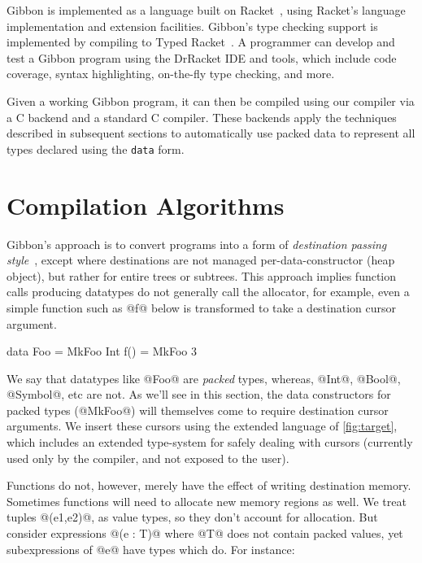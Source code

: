 \documentclass[a4paper,english]{lipics-v2016}
\newcommand{\treelang}{Gibbon\xspace} %
\newif\ifcurly
\newcommand{\finishmecurly}{\ifcurly \Red{FINISHME - do ifcurly version here} \else}
\begin{document}
\treelang is implemented as a language built on Racket~\cite{plt-tr1},
using Racket's language implementation and extension
facilities. \treelang's type checking support is implemented by
compiling to Typed Racket~\cite{typed-racket-popl08}. A programmer can
develop and test a \treelang program using the DrRacket IDE and tools,
which include code coverage, syntax highlighting, on-the-fly type
checking, and more.

Given a working \treelang program, it can then be compiled using our
compiler via a C backend and a standard C compiler. These backends
apply the techniques described in subsequent sections to automatically
use  packed data to represent all types declared using the
\texttt{data} form.  



\section{Compilation Algorithms} \label{sec:compiler}

\treelang{}'s approach is to convert programs into a form of {\em destination
  passing style}~\cite{larus89}, except where destinations are not managed
per-data-constructor (heap object), but rather for entire trees or subtrees.  This approach
implies function calls producing datatypes do not generally call the allocator,
for example, even a simple function such as @f@ below is transformed to take a
destination cursor argument.

\finishmecurly
\begin{code}
  data Foo = MkFoo Int
  f() = MkFoo 3
\end{code}
\fi

We say that datatypes like @Foo@ are {\em packed} types, whereas, @Int@, @Bool@,
@Symbol@, etc are not.  As we'll see in this section, the data constructors for
packed types (@MkFoo@) will themselves come to require destination cursor arguments.
%
We insert these cursors using the extended language of \cref{fig:target}, which
includes an extended type-system for safely dealing with cursors (currently used
only by the compiler, and not exposed to the user).

Functions do not, however, merely have the effect of writing destination memory.
Sometimes functions will need to allocate new memory regions as well.  We treat
tuples @(e1,e2)@, as value types, so they don't account for allocation.  But
consider expressions @(e : T)@ where @T@ does not contain packed values, yet
subexpressions of @e@ have types which do.  For instance:
\end{document}
